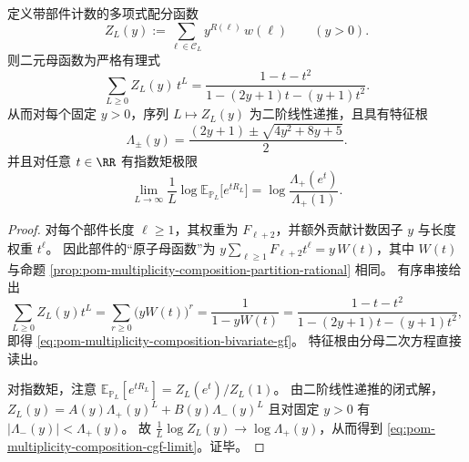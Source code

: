 \begin{proposition}[部件数的指数母函数闭式与特征根]\label{prop:pom-multiplicity-composition-part-count-bivariate-gf}
定义带部件计数的多项式配分函数
\[
Z_L(y):=\sum_{\boldsymbol{\ell}\in\mathcal{C}_L} y^{R(\boldsymbol{\ell})}\,w(\boldsymbol{\ell})
\qquad(y>0).
\]
则二元母函数为严格有理式
\begin{equation}\label{eq:pom-multiplicity-composition-bivariate-gf}
\boxed{\;
\sum_{L\ge 0} Z_L(y)\,t^L=\frac{1-t-t^2}{1-(2y+1)t-(y+1)t^2}.\;}
\end{equation}
从而对每个固定 \(y>0\)，序列 \(L\mapsto Z_L(y)\) 为二阶线性递推，且具有特征根
\[
\Lambda_\pm(y)=\frac{(2y+1)\pm\sqrt{4y^2+8y+5}}{2}.
\]
并且对任意 \(t\in\RR\) 有指数矩极限
\begin{equation}\label{eq:pom-multiplicity-composition-cgf-limit}
\boxed{\;
\lim_{L\to\infty}\frac1L\log \mathbb{E}_{\mathbb{P}_L}\!\bigl[e^{tR_L}\bigr]
=\log\frac{\Lambda_+(e^{t})}{\Lambda_+(1)}.\;}
\end{equation}
\end{proposition}
\begin{proof}
对每个部件长度 \(\ell\ge 1\)，其权重为 \(F_{\ell+2}\)，并额外贡献计数因子 \(y\) 与长度权重 \(t^\ell\)。
因此部件的“原子母函数”为
\(
y\sum_{\ell\ge 1}F_{\ell+2}t^\ell=y\,W(t)
\)，其中 \(W(t)\) 与命题 \ref{prop:pom-multiplicity-composition-partition-rational} 相同。
有序串接给出
\[
\sum_{L\ge 0}Z_L(y)t^L
=\sum_{r\ge 0}\bigl(yW(t)\bigr)^r
=\frac{1}{1-yW(t)}
=\frac{1-t-t^2}{1-(2y+1)t-(y+1)t^2},
\]
即得 \eqref{eq:pom-multiplicity-composition-bivariate-gf}。
特征根由分母二次方程直接读出。
\par
对指数矩，注意
\(
\mathbb{E}_{\mathbb{P}_L}[e^{tR_L}]
=Z_L(e^t)/Z_L(1)
\)。
由二阶线性递推的闭式解，
\(
Z_L(y)=A(y)\Lambda_+(y)^L+B(y)\Lambda_-(y)^L
\)
且对固定 \(y>0\) 有 \(|\Lambda_-(y)|<\Lambda_+(y)\)。
故
\(
\frac1L\log Z_L(y)\to \log\Lambda_+(y)
\)，从而得到 \eqref{eq:pom-multiplicity-composition-cgf-limit}。证毕。
\end{proof}

